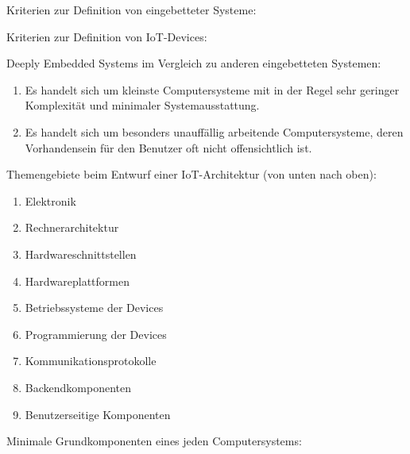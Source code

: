 \clearpage
\LoesungHeader

\teilaufgabe
Kriterien zur Definition von eingebetteter Systeme:

\teilaufgabe
Kriterien zur Definition von IoT-Devices:

\teilaufgabe
\glqq Deeply Embedded Systems\grqq{} im Vergleich zu anderen eingebetteten Systemen:

\begin{enumerate}
    \item Es handelt sich um kleinste Computersysteme mit in der Regel sehr
    geringer Komplexität und minimaler Systemausstattung.

    \setcounter{enumi}{2}   %
    \item Es handelt sich um besonders unauffällig arbeitende Computersysteme,
    deren Vorhandensein für den Benutzer oft nicht offensichtlich ist.
\end{enumerate}

\teilaufgabe
Themengebiete beim Entwurf einer IoT-Architektur (von unten nach oben):

\begin{enumerate}
    \item Elektronik
    \item Rechnerarchitektur
    \item Hardwareschnittstellen
    \item Hardwareplattformen
    \item Betriebssysteme der Devices
    \item Programmierung der Devices
    \item Kommunikationsprotokolle
    \item Backendkomponenten
    \item Benutzerseitige Komponenten
\end{enumerate}

\bigskip
\teilaufgabe
Minimale Grundkomponenten eines jeden Computersystems:

